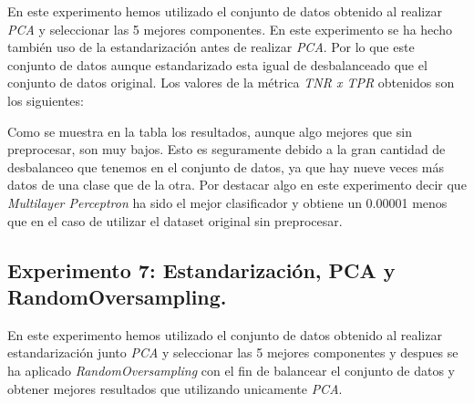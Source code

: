 \documentclass[11pt]{article}
\begin{document}
En este experimento hemos utilizado el conjunto de datos obtenido al realizar \textit{PCA} y seleccionar las 5 mejores componentes. En este experimento se ha hecho también uso de la estandarización antes de realizar \textit{PCA}. Por lo que este conjunto de datos aunque estandarizado esta igual de desbalanceado que el conjunto de datos original. Los valores de la métrica \textit{TNR x TPR} obtenidos son los siguientes:


\begin{table}[H]
	\centering
\end{table}

Como se muestra en la tabla los resultados, aunque algo mejores que sin preprocesar, son muy bajos. Esto es seguramente debido a la gran cantidad de desbalanceo que tenemos en el conjunto de datos, ya que hay nueve veces más datos de una clase que de la otra. Por destacar algo en este experimento decir que \textit{Multilayer Perceptron} ha sido el mejor clasificador y obtiene un 0.00001 menos que en el caso de utilizar el dataset original sin preprocesar.


\subsection{Experimento 7: Estandarización, PCA y RandomOversampling.}

En este experimento hemos utilizado el conjunto de datos obtenido al realizar estandarización junto \textit{PCA} y seleccionar las 5 mejores componentes y despues se ha aplicado \textit{RandomOversampling} con el fin de balancear el conjunto de datos y obtener mejores resultados que utilizando unicamente \textit{PCA}. 
\end{document}
